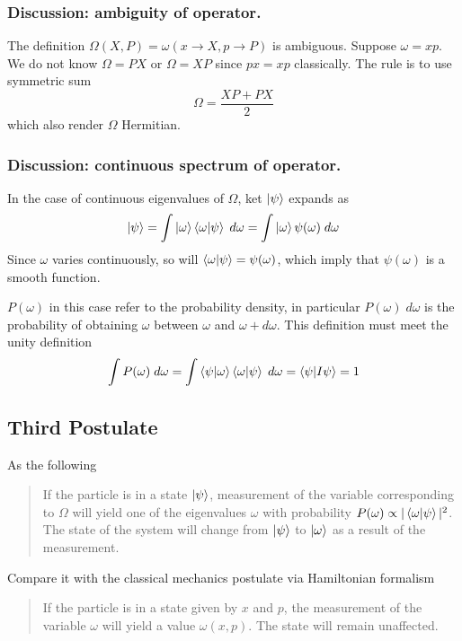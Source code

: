 \documentclass[../../../main.tex]{subfiles}
\begin{document}
\subsubsection{Discussion: ambiguity of operator.}
The definition $        \Omega(X,P)=\omega \left( x\rightarrow X, p\rightarrow P \right) $ is ambiguous.
Suppose $\omega=xp$.
We do not know $\Omega=PX$ or $\Omega=XP$ since $px=xp$ classically.
The rule is to use symmetric sum
\begin{equation*}
    \Omega=\frac{XP+PX }{2}
\end{equation*}
which also render $\Omega$ Hermitian.

\subsubsection{Discussion: continuous spectrum of operator.}
In the case of continuous eigenvalues of $\Omega$, ket $\ket{\psi}$ expands as
\begin{equation*}
    \ket{\psi}=\int \ket{\omega}\braket{\omega|\psi}\;d\omega=\int \ket{\omega}\psi(\omega)\;d\omega
\end{equation*}
Since $\omega$ varies continuously, so will $\braket{\omega|\psi}=\psi(\omega)$, which imply that $\psi(\omega)$ is a smooth function.

$P(\omega)$ in this case refer to the probability density, in particular $P(\omega)\;d\omega$ is the probability of obtaining $\omega$ between $\omega$ and $\omega+d\omega$.
This definition must meet the unity definition
\begin{equation*}
    \int P(\omega)\;d\omega=\int \braket{\psi|\omega}\braket{\omega|\psi}\;d\omega=\braket{\psi|I\psi}=1
\end{equation*}

\subsection{Third Postulate}
As the following
\begin{quotation}
    If the particle is in a state $\ket{\psi}$, measurement of the variable corresponding to $\Omega$ will yield one of the eigenvalues $\omega$ with probability $P(\omega)\propto |\braket{\omega|\psi}|^2$. The state of the system will change from $\ket{\psi}$ to $\ket{\omega}$ as a result of the measurement.
\end{quotation}
Compare it with the classical mechanics postulate via Hamiltonian formalism
\begin{quotation}
    If the particle is in a state given by $x$ and $p$, the measurement of the variable $\omega$ will yield a value $\omega(x,p)$. The state will remain unaffected.
\end{quotation}
\end{document}
